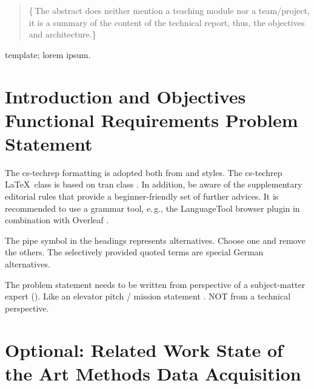 \documentclass[conference,a4paper,flushend]{cs-techrep}
\begin{document}
\selectlanguage{\cstechrepLang}

\maketitle

\begin{abstract}
\lipsum[1][3-10]
\{\,\faWarning{}The abstract does neither mention a teaching module nor a team/project,
it is a summary of the content of the technical report, thus, the objectives and architecture.\}
\end{abstract}

\begin{IEEEkeywords}
template; lorem ipsum.
\end{IEEEkeywords}

\section{Introduction and Objectives \textbar{} Functional Requirements \textbar{} Problem Statement}

The cs-techrep formatting is adopted both from  \cite{ieee2018formattingrules} and  \cite{iaria2014formattingrules} styles.
The cs-techrep \LaTeX\ class is based on tran class \cite{ieee2015howto}.
In addition, be aware of the supplementary  editorial rules \cite{iaria2009editorialrules} \faWarning{} that provide a beginner-friendly set of further advices.
It is recommended to use a grammar tool, e.\,g., the LanguageTool \cite{languagetool} browser plugin in combination with Overleaf \cite{overleaf}.

The pipe symbol \textquote{\textbar{}} in the headings represents alternatives. Choose one and remove the others. The selectively provided quoted terms are special German alternatives.

The problem statement needs to be written from perspective of a subject-matter expert (). Like an elevator pitch / mission statement \faWarning{}. NOT from a technical perspective.

\section{Optional: Related Work \textbar{} State of the Art \textbar{} Methods \textbar{} Data Acquisition}
\lipsum[2]
\end{document}

